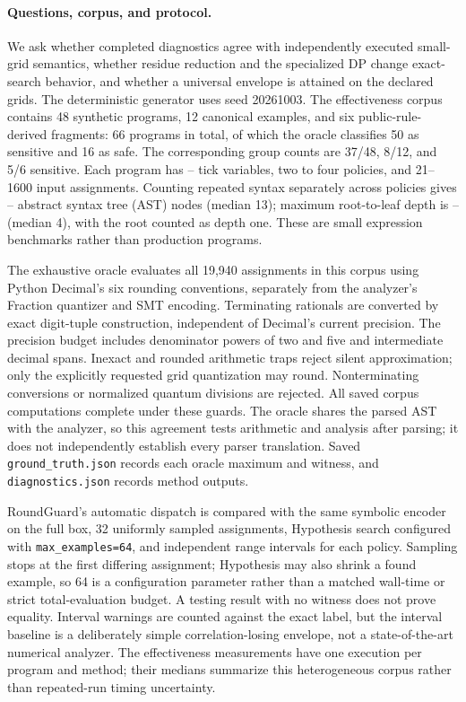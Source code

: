 \paragraph{Questions, corpus, and protocol.}
We ask whether completed diagnostics agree with independently executed small-grid semantics, whether residue reduction and the specialized DP change exact-search behavior, and whether a universal envelope is attained on the declared grids. The deterministic generator uses seed 20261003. The effectiveness corpus contains 48 synthetic programs, 12 canonical examples, and six public-rule-derived fragments: 66 programs in total, of which the oracle classifies 50 as sensitive and 16 as safe. The corresponding group counts are 37/48, 8/12, and 5/6 sensitive. Each program has \SmallVarsMin{}--\SmallVarsMax{} tick variables, two to four policies, and 21--1600 input assignments. Counting repeated syntax separately across policies gives \SmallNodesMin{}--\SmallNodesMax{} abstract syntax tree (AST) nodes (median 13); maximum root-to-leaf depth is \SmallDepthMin{}--\SmallDepthMax{} (median 4), with the root counted as depth one. These are small expression benchmarks rather than production programs.

The exhaustive oracle evaluates all 19,940 assignments in this corpus using Python Decimal's six rounding conventions, separately from the analyzer's Fraction quantizer and SMT encoding. Terminating rationals are converted by exact digit-tuple construction, independent of Decimal's current precision. The precision budget includes denominator powers of two and five and intermediate decimal spans. Inexact and rounded arithmetic traps reject silent approximation; only the explicitly requested grid quantization may round. Nonterminating conversions or normalized quantum divisions are rejected. All saved corpus computations complete under these guards. The oracle shares the parsed AST with the analyzer, so this agreement tests arithmetic and analysis after parsing; it does not independently establish every parser translation. Saved \texttt{ground\_truth.json} records each oracle maximum and witness, and \texttt{diagnostics.json} records method outputs.

RoundGuard's automatic dispatch is compared with the same symbolic encoder on the full box, 32 uniformly sampled assignments, Hypothesis search configured with \texttt{max\_examples=64}, and independent range intervals for each policy. Sampling stops at the first differing assignment; Hypothesis may also shrink a found example, so 64 is a configuration parameter rather than a matched wall-time or strict total-evaluation budget. A testing result with no witness does not prove equality. Interval warnings are counted against the exact label, but the interval baseline is a deliberately simple correlation-losing envelope, not a state-of-the-art numerical analyzer. The effectiveness measurements have one execution per program and method; their medians summarize this heterogeneous corpus rather than repeated-run timing uncertainty.

